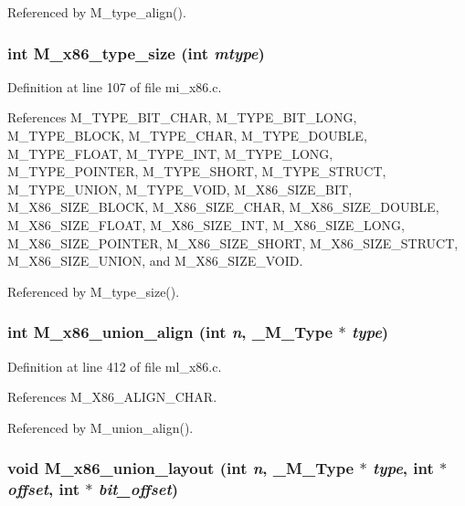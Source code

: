 Referenced by M\_\-type\_\-align().
\subsubsection{\setlength{\rightskip}{0pt plus 5cm}int M\_\-x86\_\-type\_\-size (int {\em mtype})}\label{m__x86_8h_266c4d063aea8822aa35ea838ce4db7c}




Definition at line 107 of file mi\_\-x86.c.

References M\_\-TYPE\_\-BIT\_\-CHAR, M\_\-TYPE\_\-BIT\_\-LONG, M\_\-TYPE\_\-BLOCK, M\_\-TYPE\_\-CHAR, M\_\-TYPE\_\-DOUBLE, M\_\-TYPE\_\-FLOAT, M\_\-TYPE\_\-INT, M\_\-TYPE\_\-LONG, M\_\-TYPE\_\-POINTER, M\_\-TYPE\_\-SHORT, M\_\-TYPE\_\-STRUCT, M\_\-TYPE\_\-UNION, M\_\-TYPE\_\-VOID, M\_\-X86\_\-SIZE\_\-BIT, M\_\-X86\_\-SIZE\_\-BLOCK, M\_\-X86\_\-SIZE\_\-CHAR, M\_\-X86\_\-SIZE\_\-DOUBLE, M\_\-X86\_\-SIZE\_\-FLOAT, M\_\-X86\_\-SIZE\_\-INT, M\_\-X86\_\-SIZE\_\-LONG, M\_\-X86\_\-SIZE\_\-POINTER, M\_\-X86\_\-SIZE\_\-SHORT, M\_\-X86\_\-SIZE\_\-STRUCT, M\_\-X86\_\-SIZE\_\-UNION, and M\_\-X86\_\-SIZE\_\-VOID.

Referenced by M\_\-type\_\-size().
\subsubsection{\setlength{\rightskip}{0pt plus 5cm}int M\_\-x86\_\-union\_\-align (int {\em n}, \bf{\_\-M\_\-Type} $\ast$ {\em type})}\label{m__x86_8h_a29fe0df7a6cf4f4740a60b272a2ba69}




Definition at line 412 of file ml\_\-x86.c.

References M\_\-X86\_\-ALIGN\_\-CHAR.

Referenced by M\_\-union\_\-align().
\subsubsection{\setlength{\rightskip}{0pt plus 5cm}void M\_\-x86\_\-union\_\-layout (int {\em n}, \bf{\_\-M\_\-Type} $\ast$ {\em type}, int $\ast$ {\em offset}, int $\ast$ {\em bit\_\-offset})}\label{m__x86_8h_6c2824e9db6d21b5d0d69fe70cb0be3e}




